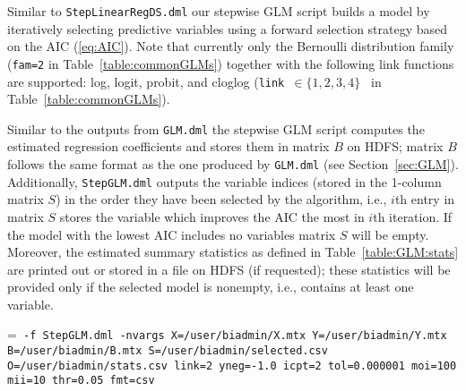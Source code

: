 \smallskip

Similar to {\tt StepLinearRegDS.dml} our stepwise GLM script builds a model by iteratively selecting predictive variables 
using a forward selection strategy based on the AIC (\ref{eq:AIC}).
Note that currently only the Bernoulli distribution family ({\tt fam=2} in Table~\ref{table:commonGLMs}) together with the following link functions are supported: log, logit, probit, and cloglog ({\tt link $\in\{1,2,3,4\}$ } in Table~\ref{table:commonGLMs}).  


\smallskip
{}
\smallskip

Similar to the outputs from {\tt GLM.dml} the stepwise GLM script computes the estimated regression coefficients and stores them in matrix $B$ on HDFS; matrix $B$ follows the same format as the one produced by {\tt GLM.dml} (see Section~\ref{sec:GLM}).   
Additionally, {\tt StepGLM.dml} outputs the variable indices (stored in the 1-column matrix $S$) in the order they have been selected by the algorithm, i.e., $i$th entry in matrix $S$ stores the variable which improves the AIC the most in $i$th iteration.  
If the model with the lowest AIC includes no variables matrix $S$ will be empty. 
Moreover, the estimated summary statistics as defined in Table~\ref{table:GLM:stats}
are printed out or stored in a file on HDFS (if requested);
these statistics will be provided only if the selected model is nonempty, i.e., contains at least one variable.


\smallskip
{}
\smallskip

{\hangindent=\parindent\noindent\tt
	\hml -f StepGLM.dml -nvargs X=/user/biadmin/X.mtx Y=/user/biadmin/Y.mtx	B=/user/biadmin/B.mtx S=/user/biadmin/selected.csv O=/user/biadmin/stats.csv link=2 yneg=-1.0 icpt=2 tol=0.000001  moi=100 mii=10 thr=0.05 fmt=csv
	
}



